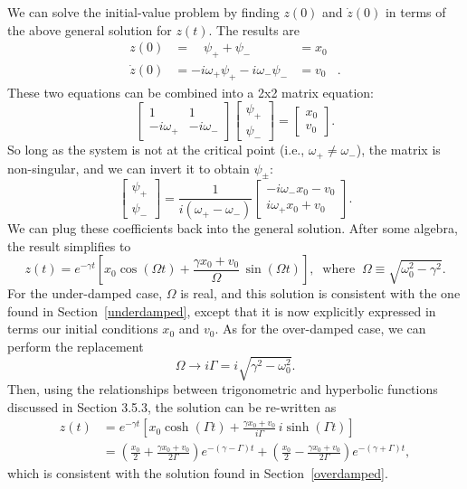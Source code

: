 \documentclass[10pt,a4paper]{article}
\begin{document}
We can solve the initial-value problem by finding $z(0)$ and
$\dot{z}(0)$ in terms of the above general solution for $z(t)$. The
results are
\begin{align}
  z(0) &= \quad \psi_+ + \psi_- &= x_0& \\
  \dot{z}(0) &= -i\omega_+ \psi_+ - i \omega_- \psi_- &= v_0&.
\end{align}
These two equations can be combined into a 2x2 matrix equation:
\begin{equation}
\begin{bmatrix}1 & 1 \\ -i\omega_+ & -i\omega_-\end{bmatrix} \begin{bmatrix}\psi_+ \\ \psi_-\end{bmatrix} = \begin{bmatrix}x_0 \\ v_0\end{bmatrix}.
\end{equation}
So long as the system is not at the critical point (i.e.,
$\omega_+ \ne \omega_-$), the matrix is non-singular, and we can
invert it to obtain $\psi_\pm$:
\begin{equation}
\begin{bmatrix}\psi_+ \\ \psi_-\end{bmatrix} = \frac{1}{i(\omega_+-\omega_-)}\begin{bmatrix}-i\omega_-x_0 - v_0 \\ i\omega_+x_0 + v_0 \end{bmatrix}.
\end{equation}
We can plug these coefficients back into the general solution. After
some algebra, the result simplifies to
\begin{equation}
z(t) = e^{-\gamma t} \left[x_0 \cos(\Omega t) + \frac{\gamma x_0 + v_0}{\Omega} \, \sin(\Omega t)\right], \;\; \mathrm{where}\;\; \Omega \equiv \sqrt{\omega_0^2 - \gamma^2}.
\end{equation}
For the under-damped case, $\Omega$ is real, and this solution is
consistent with the one found in Section~\ref{underdamped}, except
that it is now explicitly expressed in terms our initial conditions
$x_0$ and $v_0$.  As for the over-damped case, we can perform the
replacement
\begin{equation}
\Omega \rightarrow i \Gamma = i \sqrt{\gamma^2 - \omega_0^2}.
\end{equation}
Then, using the relationships between trigonometric and hyperbolic
functions discussed in Section 3.5.3, the solution can be re-written
as
\begin{align}
  z(t) &= e^{-\gamma t} \left[x_0 \cosh(\Gamma t) + \frac{\gamma x_0 + v_0}{i\Gamma} \, i \sinh(\Gamma t)\right] \\
  &= \left(\frac{x_0}{2} + \frac{\gamma x_0 + v_0}{2\Gamma}\right) e^{-(\gamma - \Gamma) t} + \left(\frac{x_0}{2} - \frac{\gamma x_0 + v_0}{2\Gamma}\right) e^{-(\gamma+\Gamma)t},
\end{align}
which is consistent with the solution found in
Section~\ref{overdamped}.
\end{document}
